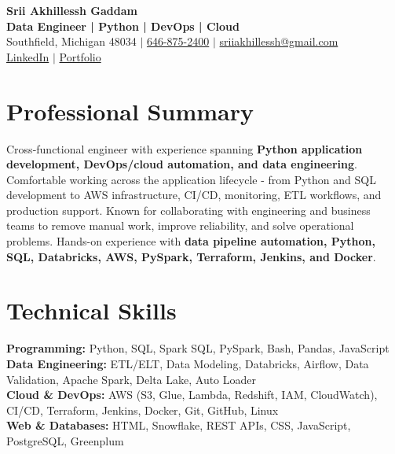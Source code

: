 \documentclass[letterpaper,10pt]{article}
\begin{document}
\fontsize{9.35pt}{10.45pt}\selectfont

\begin{center}
    {\LARGE \textbf{Srii Akhillessh Gaddam}} \\[-1pt]
    \textbf{Data Engineer | Python | DevOps | Cloud} \\[2pt]
    Southfield, Michigan 48034 $|$
    \href{tel:6468752400}{646-875-2400} $|$
    \href{mailto:sriiakhillessh@gmail.com}{sriiakhillessh@gmail.com} \\[1pt]
    \href{https://www.linkedin.com/in/srii-akhiilessh-gaddam-b48668191/}{LinkedIn} $|$
    \href{https://sriiakhillesshg.github.io/portfolio/}{Portfolio}
\end{center}
\vspace{-8pt}

\section{Professional Summary}
\small{Cross-functional engineer with experience spanning \textbf{Python application development, DevOps/cloud automation, and data engineering}. Comfortable working across the application lifecycle - from Python and SQL development to AWS infrastructure, CI/CD, monitoring, ETL workflows, and production support. Known for collaborating with engineering and business teams to remove manual work, improve reliability, and solve operational problems. Hands-on experience with \textbf{data pipeline automation, Python, SQL, Databricks, AWS, PySpark, Terraform, Jenkins, and Docker}.}

\section{Technical Skills}
\small{
\textbf{Programming:} Python, SQL, Spark SQL, PySpark, Bash, Pandas, JavaScript \\
\textbf{Data Engineering:} ETL/ELT, Data Modeling, Databricks, Airflow, Data Validation, Apache Spark, Delta Lake, Auto Loader \\
\textbf{Cloud \& DevOps:} AWS (S3, Glue, Lambda, Redshift, IAM, CloudWatch), CI/CD, Terraform, Jenkins, Docker, Git, GitHub, Linux \\
\textbf{Web \& Databases:} HTML, Snowflake, REST APIs, CSS, JavaScript, PostgreSQL, Greenplum
}

\end{document}
